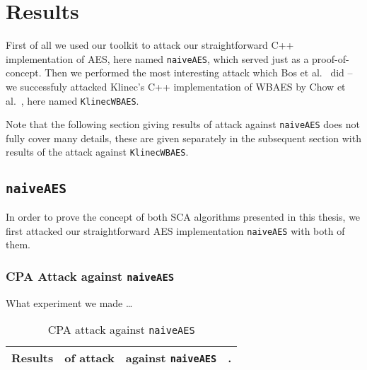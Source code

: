 \section{Results}
\label{sec:results}

First of all we used our toolkit to attack our straightforward C++ implementation of AES, here named {\tt naiveAES}, which served just as a proof-of-concept. Then we performed the most interesting attack which Bos et al.\ \cite{bos2015differential} did -- we successfuly attacked Klinec's C++ implementation \cite{klinec2013implementation} of WBAES by Chow et al.\ \cite{chow2003aes}, here named {\tt KlinecWBAES}.

Note that the following section giving results of attack against {\tt naiveAES} does not fully cover many details, these are given separately in the subsequent section with results of the attack against {\tt KlinecWBAES}.



\subsection{\tt naiveAES}
\label{sec:naiveaes}

In order to prove the concept of both SCA algorithms presented in this thesis, we first attacked our straightforward AES implementation {\tt naiveAES} with both of them.

\subsubsection{CPA Attack against {\tt naiveAES}}
	
	What experiment we made \ldots
	
	\begin{table}[H]
		\begin{center}
		\begin{tabular}{| c | c | c | c |}
			\hline
			Results & of attack & against {\tt naiveAES} & . \\
			\hline
		\end{tabular}
		\end{center}
	\caption{CPA attack against {\tt naiveAES}}
	\label{tab:naiveaescpa}
	\end{table}
	

